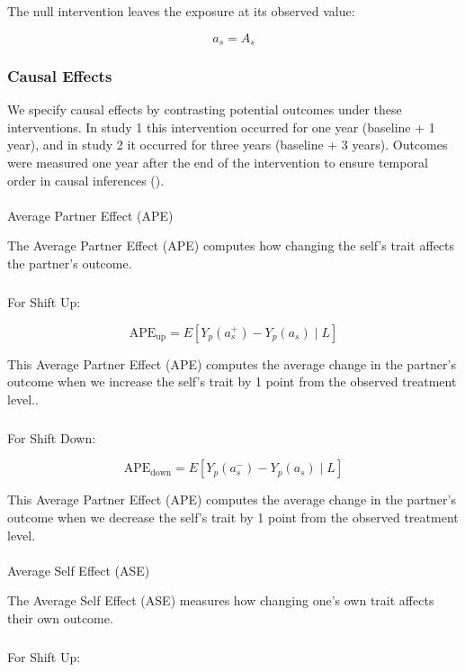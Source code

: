\documentclass[
  singlecolumn]{article}
\makeatletter
\let\oldparagraph\paragraph
\renewcommand{\paragraph}{
    \@ifstar
      \xxxParagraphStar
      \xxxParagraphNoStar
  }
\newcommand{\xxxParagraphStar}[1]{\oldparagraph*{#1}\mbox{}}
\newcommand{\xxxParagraphNoStar}[1]{\oldparagraph{#1}\mbox{}}
\let\oldsubparagraph\subparagraph
\renewcommand{\subparagraph}{
    \@ifstar
      \xxxSubParagraphStar
      \xxxSubParagraphNoStar
  }
\newcommand{\xxxSubParagraphStar}[1]{\oldsubparagraph*{#1}\mbox{}}
\newcommand{\xxxSubParagraphNoStar}[1]{\oldsubparagraph{#1}\mbox{}}
\makeatother
\begin{document}
The null intervention leaves the exposure at its observed value:

\[
a_s = A_s
\]

\subsubsection{Causal Effects}\label{causal-effects}

We specify causal effects by contrasting potential outcomes under these
interventions. In study 1 this intervention occurred for one year
(baseline + 1 year), and in study 2 it occurred for three years
(baseline + 3 years). Outcomes were measured one year after the end of
the intervention to ensure temporal order in causal inferences
().

\paragraph{Average Partner Effect
(APE)}\label{average-partner-effect-ape}

The Average Partner Effect (APE) computes how changing the self's trait
affects the partner's outcome.

\subparagraph{For Shift Up:}\label{for-shift-up}

\[
\text{APE}_{\text{up}} = E\left[ Y_p(a_s^+) - Y_p(a_s) \mid L \right]
\]

This Average Partner Effect (APE) computes the average change in the
partner's outcome when we increase the self's trait by 1 point from the
observed treatment level..

\subparagraph{For Shift Down:}\label{for-shift-down}

\[
\text{APE}_{\text{down}} = E\left[ Y_p(a_s^-) - Y_p(a_s) \mid L \right]
\]

This Average Partner Effect (APE) computes the average change in the
partner's outcome when we decrease the self's trait by 1 point from the
observed treatment level.

\paragraph{Average Self Effect (ASE)}\label{average-self-effect-ase}

The Average Self Effect (ASE) measures how changing one's own trait
affects their own outcome.

\subparagraph{For Shift Up:}\label{for-shift-up-1}
\end{document}
